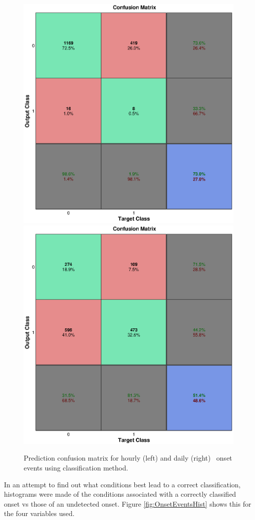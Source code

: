 \begin{figure}[htp!]
	\centering
	\includegraphics[width=0.45\linewidth]{Figures/CH5/NNBinaryOnset-hourly.eps}
	\includegraphics[width=0.45\linewidth]{Figures/CH5/NNBinaryOnset-daily.eps}
	\caption{Prediction confusion matrix for hourly (left) and daily (right) \req\ onset events using classification method.}
	\label{fig:OnsetEvents}
\end{figure}

In an attempt to find out what conditions best lead to a correct classification, histograms were made of the conditions associated with a correctly classified onset vs those of an undetected onset. Figure \ref{fig:OnsetEventsHist} shows this for the four variables used.

